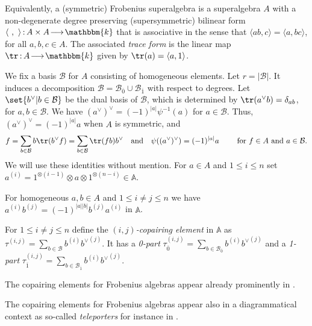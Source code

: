 \documentclass[a4paper,11pt]{amsart}
\def\map#1#2{\,{:}\,#1\!\longrightarrow\!#2}
\let\<\langle
\let\>\rangle
\let\ov\overline
\newcommand\cB{\mathcal{B}}
\numberwithin{equation}{subsection}
\theoremstyle{definition}
\theoremstyle{theorem}
\theoremstyle{remark}
\newcommand\kk{\mathbbm{k}}
\newcommand{\Ao}{\mathbb{A}}
\begin{document}
Equivalently, a (symmetric) Frobenius superalgebra is a  superalgebra $A$ with a non-degenerate degree preserving (supersymmetric) bilinear form $\<\ ,\ \>\map{A\times A}\kk$
  that is associative in the sense that $\<ab,c\> =
  \<a,bc\>$, for all $a,b,c\in A$. The associated \emph{trace form} is
  the linear map $\tr\map A\kk$ given by $\tr(a)=\<a,1\>$.


  We fix a basis $\cB$ for $A$ consisting of homogeneous elements. Let $r=|\cB|$.  It induces a decomposition $\cB=\cB_{\ov{0}}\cup\cB_{\ov{1}}$ with respect to degrees.
 Let $\set{b^\vee|b\in \cB}$ be the dual basis of $\cB$, which is determined by
  $\tr(a^\vee b)=\delta_{ab}$, for $a,b\in \cB$.
  We have $(a^\vee)^\vee=(-1)^{|a|}\psi^{-1}(a)$ for $a\in\cB$. Thus,
  $(a^\vee)^\vee=(-1)^{|a|}a$ when $A$ is symmetric, and
  \begin{equation}\label{traceformulas}
    f = \sum_{b\in \cB}b\tr(b^\vee f) = \sum_{b\in \cB}\tr(fb)b^\vee\quad\text{and}\quad \psi((a^\vee)^\vee)=(-1)^{|a|}a
    \qquad\text{ for $f\in A$ and $a\in\cB$.}
  \end{equation}
  We will use these identities without mention. For  $a\in A$ and $1\leq i\leq n$ set
 $a^{(i)}=1^{\otimes(i-1)}\otimes a\otimes1^{\otimes(n-i)}\in\Ao$.
  \begin{Remark}\label{signs}
 For homogeneous $a,b\in A$ and $1\leq i\not=j\leq n$ we have  $a^{(i)}b^{(j)}=(-1)^{|a||b|}b^{(j)}a^{(i)}$ in $\Ao$.
 \end{Remark}
   \begin{Definition}\label{parts}
For $1\le i\not=j\le n$ define the \emph{$(i,j)$-copairing element} in $\Ao$ as $\tau^{(i,j)} = \sum_{b\in\cB}b^{(i)}{b^\vee}^{(j)}$. It has a  \emph{0-part} $\tau^{(i,j)}_{\ov{0}}=\sum_{b\in\cB_{\ov0}}b^{(i)}{b^\vee}^{(j)}$ and a \emph{1-part} $\tau^{(i,j)}_{\ov{1}}=\sum_{b\in\cB_{\ov{1}}}b^{(i)}{b^\vee}^{(j)}$.
   \end{Definition}

\begin{Remark} The copairing elements for Frobenius algebras appear already prominently in \cite{RossoSavage:QuantumAffineWreath,Savage:AffineWreath}.
\end{Remark}

\begin{Remark}The copairing elements for Frobenius algebras appear also in a diagrammatical context as so-called \emph{teleporters} for instance in \cite{SavageHeis, BSWHeis}.
\end{Remark}
\end{document}
